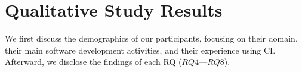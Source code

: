 \section{\textbf{Qualitative Study Results}}
\label{sec_qualitative_study_results}

We first discuss the demographics of our participants, focusing on their domain, their main software development activities, and their experience using CI. Afterward, we disclose the findings of each RQ ($RQ4$---$RQ8$).






